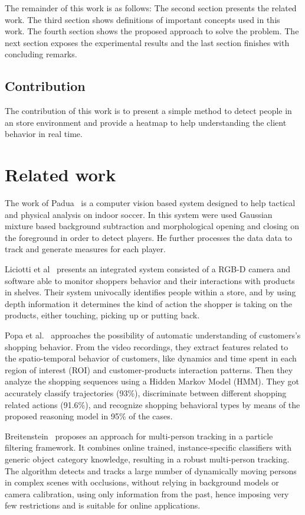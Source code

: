 \documentclass[10pt, conference]{IEEEtran}
\begin{document}
	The remainder of this work is as follows: The second section presents the related work. The third section shows definitions of important concepts used in this work. The fourth section shows the proposed approach to solve the problem. The next section exposes the experimental results and the last section finishes with concluding remarks.
	
	\subsection{Contribution}
	The contribution of this work is to present a simple method to detect people in an store environment and provide a heatmap to help understanding the client behavior in real time.
	
	\section{Related work}
	The work of Padua~\cite{padua2014sistema} is a computer vision based system designed to help tactical and physical analysis on indoor soccer. In this system were used Gaussian mixture based background subtraction\cite{zivkovic2004improved} and morphological opening and closing\cite{haralick1987image} on the foreground in order to detect players. He further processes the data data to track and generate measures for each player.
	
	Liciotti et al~\cite{liciotti2014shopper} presents an integrated system consisted of a RGB-D camera and software able to monitor shoppers behavior and their interactions with products in shelves. Their system univocally identifies people within a store, and by using depth information it determines the kind of action the shopper is taking on the products, either touching, picking up or putting back.
	
	Popa et al.~\cite{popa2013semantic} approaches the possibility of automatic understanding of customers’s shopping behavior. From the video recordings, they extract features related to the spatio-temporal behavior of customers, like dynamics and time spent in each region of interest (ROI) and customer-products interaction patterns. Then they analyze the shopping sequences using a Hidden Markov Model (HMM). They got accurately classify trajectories (93\%), discriminate between different shopping related actions (91.6\%), and recognize shopping behavioral types by means of the proposed reasoning model in 95\% of the cases.
	
	Breitenstein~\cite{breitenstein2011online} proposes an approach for multi-person tracking in a particle filtering framework. It combines online trained, instance-specific classifiers with generic object category knowledge, resulting in a robust multi-person tracking. The algorithm detects and tracks a large number of dynamically moving persons in complex scenes with occlusions, without relying in background models or camera calibration, using only information from the past, hence imposing very few restrictions and is suitable for online applications.
	
\end{document}
